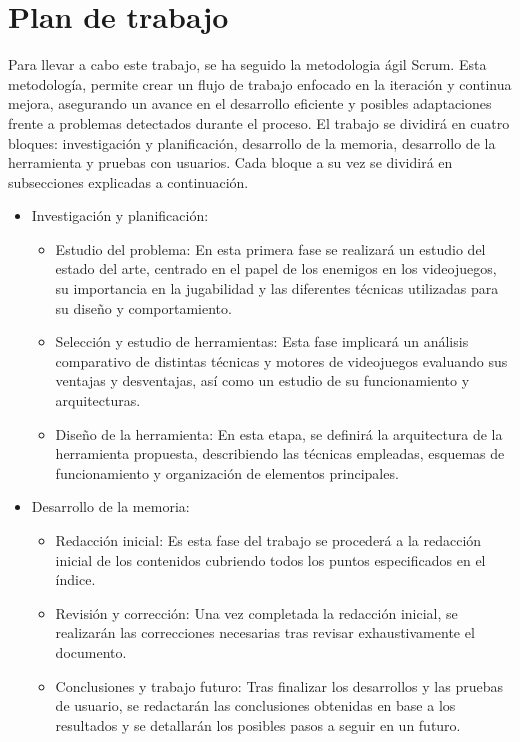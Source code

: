 \section{Plan de trabajo}
Para llevar a cabo este trabajo, se ha seguido la metodologia ágil Scrum. Esta metodología, permite crear un flujo de trabajo enfocado en la iteración y continua mejora, asegurando un avance en el desarrollo eficiente y posibles adaptaciones frente a problemas detectados durante el proceso. 
El trabajo se dividirá en cuatro bloques: investigación y planificación, desarrollo de la memoria, desarrollo de la herramienta y pruebas con usuarios.
Cada bloque a su vez se dividirá en subsecciones explicadas a continuación.
\begin{itemize}
    \item  Investigación y planificación:
	\begin{itemize}
	    \item  Estudio del problema: En esta primera fase se realizará un estudio del estado del arte, centrado en el papel de los enemigos en los videojuegos, su importancia en la jugabilidad y las diferentes técnicas utilizadas para su diseño y comportamiento.
	    \item Selección y estudio de herramientas: Esta fase implicará un análisis comparativo de distintas técnicas y motores de videojuegos evaluando sus ventajas y desventajas, así como un estudio de su funcionamiento y  arquitecturas.
	    \item Diseño de la herramienta: En esta etapa, se definirá la arquitectura de la herramienta propuesta, describiendo las técnicas empleadas, esquemas de funcionamiento y organización de elementos principales.
	\end{itemize}
  \item Desarrollo de la memoria: 
	\begin{itemize}
	    \item  Redacción inicial: Es esta fase del trabajo se procederá a la redacción inicial de los contenidos cubriendo todos los puntos especificados en el índice.
	    \item Revisión y corrección: Una vez completada la redacción inicial, se realizarán las correcciones necesarias tras revisar exhaustivamente el documento.
	    \item Conclusiones y trabajo futuro: Tras finalizar los desarrollos y las pruebas de usuario, se redactarán las conclusiones obtenidas en base a los resultados y se detallarán los posibles pasos a seguir en un futuro.
	\end{itemize}

\end{itemize}
